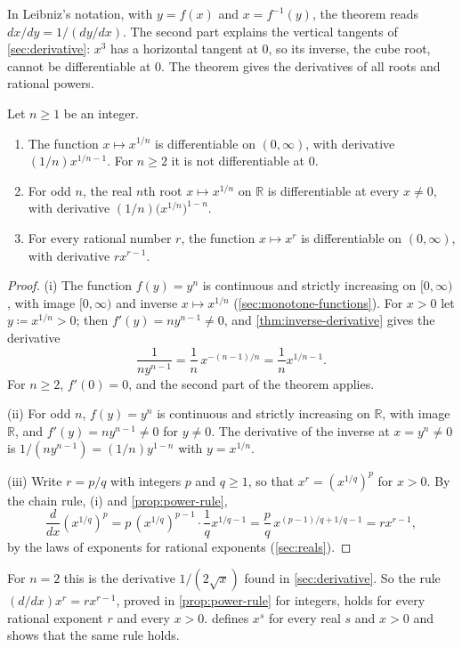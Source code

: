 In Leibniz's notation, with $y=f(x)$ and $x=f^{-1}(y)$, the theorem reads $dx/dy=1/(dy/dx)$. The second part explains the vertical tangents of \cref{sec:derivative}: $x^3$ has a horizontal tangent at $0$, so its inverse, the cube root, cannot be differentiable at $0$. The theorem gives the derivatives of all roots and rational powers.

\begin{corollary}
\label{cor:root-derivative}
Let $n\ge1$ be an integer.
\begin{enumerate}
\item The function $x\mapsto x^{1/n}$ is differentiable on $(0,\infty)$, with derivative $(1/n)x^{1/n-1}$. For $n\ge2$ it is not differentiable at $0$.
\item For odd $n$, the real $n$th root $x\mapsto x^{1/n}$ on $\mathbb R$ is differentiable at every $x\ne0$, with derivative $(1/n)\bigl(x^{1/n}\bigr)^{1-n}$.
\item For every rational number $r$, the function $x\mapsto x^r$ is differentiable on $(0,\infty)$, with derivative $rx^{r-1}$.
\end{enumerate}
\end{corollary}

\begin{proof}
(i) The function $f(y)=y^n$ is continuous and strictly increasing on $[0,\infty)$, with image $[0,\infty)$ and inverse $x\mapsto x^{1/n}$ (\cref{sec:monotone-functions}). For $x>0$ let $y\coloneqq x^{1/n}>0$; then $f'(y)=ny^{n-1}\ne0$, and \cref{thm:inverse-derivative} gives the derivative
\[
\frac1{ny^{n-1}}=\frac1n\,x^{-(n-1)/n}=\frac1nx^{1/n-1}.
\]
For $n\ge2$, $f'(0)=0$, and the second part of the theorem applies.

(ii) For odd $n$, $f(y)=y^n$ is continuous and strictly increasing on $\mathbb R$, with image $\mathbb R$, and $f'(y)=ny^{n-1}\ne0$ for $y\ne0$. The derivative of the inverse at $x=y^n\ne0$ is $1/(ny^{n-1})=(1/n) y^{1-n}$ with $y=x^{1/n}$.

(iii) Write $r=p/q$ with integers $p$ and $q\ge1$, so that $x^r=(x^{1/q})^p$ for $x>0$. By the chain rule, (i) and \cref{prop:power-rule},
\[
\frac d{dx}(x^{1/q})^p=p\,(x^{1/q})^{p-1}\cdot\frac1qx^{1/q-1}=\frac pq\,x^{(p-1)/q+1/q-1}=rx^{r-1},
\]
by the laws of exponents for rational exponents (\cref{sec:reals}).
\end{proof}

For $n=2$ this is the derivative $1/(2\sqrt x)$ found in \cref{sec:derivative}. So the rule $(d/dx)x^r=rx^{r-1}$, proved in \cref{prop:power-rule} for integers, holds for every rational exponent $r$ and every $x>0$.  defines $x^s$ for every real $s$ and $x>0$ and shows that the same rule holds.

